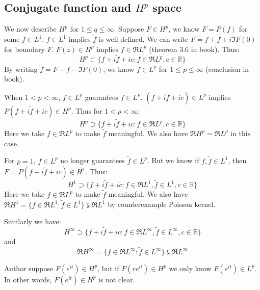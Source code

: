 \subsection{Conjugate function and $H^p$ space}
We now describe $H^p$ for $1\leq q\leq \infty$. Suppose $F\in H^p$, we know $F=P(f)$ for some $f\in L^1$. $f\in L^1$ implies $\tilde{f}$ is well defined.
We can write $F=f+\tilde{f}+i\Im{F(0)}$ for boundary $F$. $F(z)\in H^p$ implies $f\in\Re{L^p}$ (theorem 3.6 in book). Thus:
\begin{equation*}
    H^p\subset\{f+i\tilde{f}+i c:f\in\Re{L^p}, c\in\mathbb{R}\}
\end{equation*}
{\color{blue} By writing $\tilde{f}=F-f-\Im{F(0)}$, we know $\tilde{f}\in L^p$ for $1\leq p\leq\infty$ (conclusion in book)}.\par
When $1<p<\infty$, $f\in L^p$ guarantees $\tilde{f}\in L^p$. $(f+i\tilde{f}+ic)\in L^p$ implies $P(f+i\tilde{f}+ic)\in H^p$. Thus for $1<p<\infty$:
\begin{equation*}
    H^p\supset\{f+i\tilde{f}+i c:f\in\Re{L^p}, c\in\mathbb{R}\}
\end{equation*}
Here we take $f\in\Re{L^p}$ to make $\tilde{f}$ meaningful. We also have $\Re{H^p}=\Re{L^p}$ in this case.\par
For $p=1$, $f\in L^p$ no longer guarantees $\tilde{f}\in L^p$. But we know if $f,\tilde{f}\in L^1$, then $F=P(f+i\tilde{f}+ic)\in H^1$. Thus:
\begin{equation*}
    H^1\supset\{f+i\tilde{f}+i c:f\in\Re{L^1},\tilde{f}\in{L^1}, c\in\mathbb{R}\}
\end{equation*}
Here we take $f\in\Re{L^p}$ to make $\tilde{f}$ meaningful. We also have $ \Re{H^1}=\{f\in\Re{L^1}:\tilde{f}\in{L^1}\}\subsetneqq\Re{L^1}$ by counterexample Poisson kernel.\par
Similarly we have:
\begin{equation*}
    H^\infty\supset\{f+i\tilde{f}+i c:f\in\Re{L^\infty},\tilde{f}\in{L^\infty}, c\in\mathbb{R}\}
\end{equation*}
and
\begin{equation*}
    \Re{H^\infty}=\{f\in\Re{L^\infty}:\tilde{f}\in{L^\infty}\}\subsetneqq\Re{L^\infty}
\end{equation*}
\begin{remark}
    Author suppose $F(e^{it})\in H^p$, but if $F(re^{it})\in H^p$ we only know $F(e^{it})\in L^p$. {\color{red}In other words, $F(e^{it})\in H^p$ is not clear}.
\end{remark}
